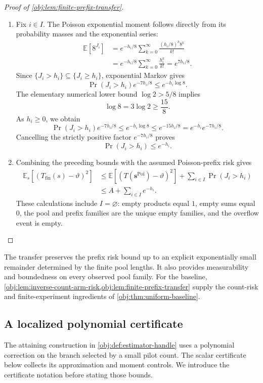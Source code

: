 \documentclass[11pt]{article}
\begin{document}
\begin{proof}[Proof of \cref{obj:lem:finite-prefix-transfer}]
\begin{enumerate}
\item Fix \(i\in I\). The Poisson exponential moment follows directly from its probability masses and the exponential series:
\[
\begin{aligned}
\mathbb E[8^{J_i}]
&=
e^{-h_i/8}
\sum_{k=0}^{\infty}
\frac{(h_i/8)^k8^k}{k!}\\
&=
e^{-h_i/8}
\sum_{k=0}^{\infty}\frac{h_i^k}{k!}
=
e^{7h_i/8}.
\end{aligned}
\]
Since \(\{J_i>h_i\}\subseteq\{J_i\ge h_i\}\), exponential Markov gives
\[
\Pr(J_i>h_i)e^{-7h_i/8}
\le
e^{-h_i\log8}.
\]
The elementary numerical lower bound \(\log2>5/8\) implies
\[
\log8=3\log2\ge\frac{15}{8}.
\]
As \(h_i\ge0\), we obtain
\[
\Pr(J_i>h_i)e^{-7h_i/8}
\le
e^{-h_i\log8}
\le
e^{-15h_i/8}
=
e^{-h_i}e^{-7h_i/8}.
\]
Cancelling the strictly positive factor \(e^{-7h_i/8}\) proves
\[
\Pr(J_i>h_i)\le e^{-h_i}.
\] %

\item Combining the preceding bounds with the assumed Poisson-prefix risk gives
\[
\begin{aligned}
\mathbb E_s[(T_{\mathrm{fin}}(s)-\vartheta)^2]
&\le
\mathbb E[(T(\boldsymbol s^{\mathrm{Poi}})-\vartheta)^2]
+\sum_{i\in I}\Pr(J_i>h_i)\\
&\le
A+\sum_{i\in I}e^{-h_i}.
\end{aligned}
\]
These calculations include \(I=\varnothing\): empty products equal \(1\), empty sums equal \(0\), the pool and prefix families are the unique empty families, and the overflow event is empty. %
\end{enumerate}
\end{proof}

The transfer preserves the prefix risk bound up to an explicit exponentially small remainder determined by the finite pool lengths. It also provides measurability and boundedness on every observed pool family. For the baseline, \cref{obj:lem:inverse-count-arm-risk,obj:lem:finite-prefix-transfer} supply the count-risk and finite-experiment ingredients of \cref{obj:thm:uniform-baseline}.

\subsection{A localized polynomial certificate}

The attaining construction in \cref{obj:def:estimator-handle} uses a polynomial correction on the branch selected by a small pilot count. The scalar certificate below collects its approximation and moment controls. We introduce the certificate notation before stating those bounds.
\end{document}
